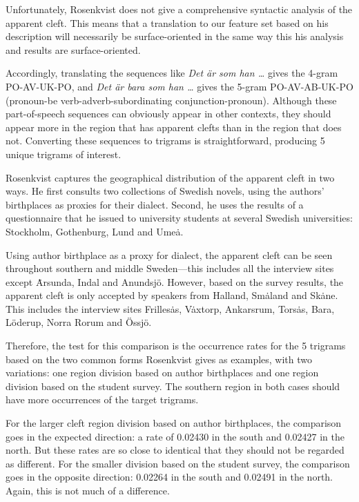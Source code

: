 Unfortunately, Rosenkvist does not give a comprehensive syntactic
analysis of the apparent cleft. This means that a translation to our
feature set based on his description will necessarily be
surface-oriented in the same way this his analysis and results are
surface-oriented.

Accordingly, translating the sequences like {\it Det \"ar som han
  \ldots} gives the 4-gram PO-AV-UK-PO, and {\it Det \"ar bara som han
  \ldots} gives the 5-gram PO-AV-AB-UK-PO (pronoun-be
verb-adverb-subordinating conjunction-pronoun). Although these
part-of-speech sequences can obviously appear in other contexts, they
should appear more in the region that has apparent clefts than in the
region that does not. Converting these sequences to trigrams is
straightforward, producing 5 unique trigrams of interest.

Rosenkvist captures the geographical distribution of the apparent
cleft in two ways. He first consults two collections of Swedish
novels, using the authors' birthplaces as proxies for their
dialect. Second, he uses the results of a questionnaire that he issued
to university students at several Swedish universities: Stockholm,
Gothenburg, Lund and Ume\.a.

Using author birthplace as a proxy for dialect, the apparent cleft can
be seen throughout southern and middle Sweden---this includes all the
interview sites except \.Arsunda, Indal and Anundsj\"o. However, based
on the survey results, the apparent cleft is only accepted by speakers
from Halland, Sm\.aland and Sk\.ane. This includes the interview sites
Frilles\.as, V\.axtorp, Ankarsrum, Tors\.as, Bara, L\"oderup, Norra
Rorum and \"Ossj\"o.

Therefore, the test for this comparison is the occurrence rates
for the 5 trigrams based on the two common forms Rosenkvist gives as
examples, with two variations: one region division based on author
birthplaces and one region division based on the student survey. The
southern region in both cases should have more occurrences of the
target trigrams.

For the larger cleft region division based on author birthplaces, the
comparison goes in the expected direction: a rate of 0.02430 in the
south and 0.02427 in the north. But these rates are so close to identical
that they should not be regarded as different. For the smaller division
based on the student survey, the comparison goes in the opposite
direction: 0.02264 in the south and 0.02491 in the north. Again, this
is not much of a difference.

